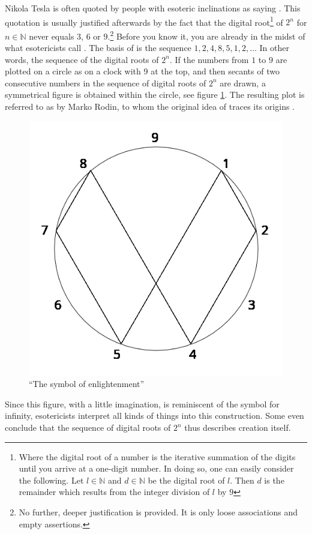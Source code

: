 \documentclass{article}
\newcommand{\N}{\mathbb{N}}
\begin{document}
Nikola Tesla is often quoted by people with esoteric inclinations as saying  \cite{omnia,goodreads}. This quotation is usually justified afterwards by the fact that the digital 
root\footnote{Where the digital root of a number is the iterative summation of the digits until you arrive at a one-digit number. In doing so, 
one can easily consider the following. Let $l\in\N$ and $d\in\N$ be the digital root of $l$. Then $d$ is the remainder which results from the integer 
division of $l$ by $9$} of $2^n$ for $n\in\N$ never equals $3$, $6$ or $9$.\footnote{No further, deeper justification is provided. It is only loose 
associations and empty assertions.} Before you know it, you are already in the midst of what esotericists call . 
The basis of  is the sequence $1, 2, 4, 8, 5, 1, 2,\ldots$ In other words, the sequence of the digital roots of $2^n$. If the numbers 
from $1$ to $9$ are plotted on a circle as on a clock with 9 at the top, and then secants of two consecutive numbers in the sequence of digital roots 
of $2^n$ are drawn, a symmetrical figure is obtained within the circle, see figure \ref{fig:vvortex}. The resulting plot is referred to as 
 by Marko Rodin, to whom the original idea of  traces its origins \cite{omnia, powell}.
\begin{figure}[ht]
    \centering
    \includegraphics[scale=0.25]{images/vortex.png}
    \caption{``The symbol of enlightenment''}
    \label{fig:vvortex}
\end{figure}
Since this figure, with a little imagination, is reminiscent of the symbol for infinity, esotericists interpret all kinds of things into this construction. 
Some even conclude that the sequence of digital roots of $2^n$ thus describes creation itself.\newline
\end{document}
